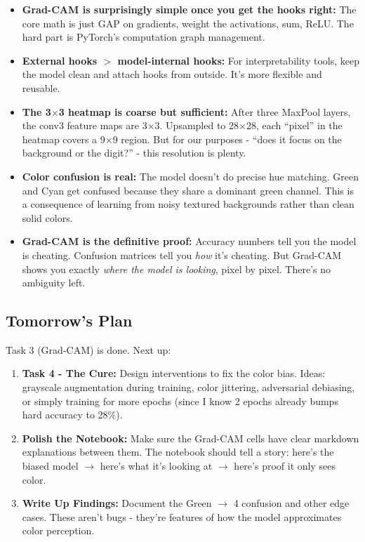 \documentclass[9pt,a4paper,twocolumn,twoside]{tau-class/tau}
\begin{document}
        \begin{itemize}
            \item \textbf{Grad-CAM is surprisingly simple once you get the hooks right:} The core math is just GAP on gradients, weight the activations, sum, ReLU. The hard part is PyTorch's computation graph management.

            \item \textbf{External hooks $>$ model-internal hooks:} For interpretability tools, keep the model clean and attach hooks from outside. It's more flexible and reusable.

            \item \textbf{The 3$\times$3 heatmap is coarse but sufficient:} After three MaxPool layers, the conv3 feature maps are 3$\times$3. Upsampled to 28$\times$28, each ``pixel'' in the heatmap covers a 9$\times$9 region. But for our purposes - ``does it focus on the background or the digit?'' - this resolution is plenty.

            \item \textbf{Color confusion is real:} The model doesn't do precise hue matching. Green and Cyan get confused because they share a dominant green channel. This is a consequence of learning from noisy textured backgrounds rather than clean solid colors.

            \item \textbf{Grad-CAM is the definitive proof:} Accuracy numbers tell you the model is cheating. Confusion matrices tell you \textit{how} it's cheating. But Grad-CAM shows you exactly \textit{where the model is looking}, pixel by pixel. There's no ambiguity left.
        \end{itemize}

    \subsection{Tomorrow's Plan}

        Task 3 (Grad-CAM) is done. Next up:

        \begin{enumerate}
            \item \textbf{Task 4 - The Cure:} Design interventions to fix the color bias. Ideas: grayscale augmentation during training, color jittering, adversarial debiasing, or simply training for more epochs (since I know 2 epochs already bumps hard accuracy to 28\%).

            \item \textbf{Polish the Notebook:} Make sure the Grad-CAM cells have clear markdown explanations between them. The notebook should tell a story: here's the biased model $\rightarrow$ here's what it's looking at $\rightarrow$ here's proof it only sees color.

            \item \textbf{Write Up Findings:} Document the Green $\rightarrow$ 4 confusion and other edge cases. These aren't bugs - they're features of how the model approximates color perception.
        \end{enumerate}
\end{document}
